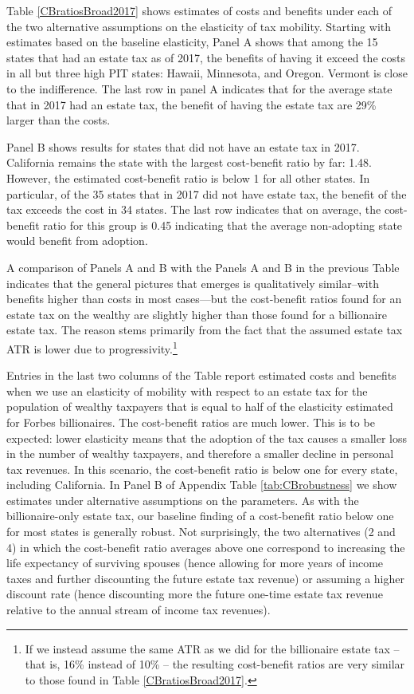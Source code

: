 \documentclass[12pt]{article}
\begin{document}
Table \ref{CBratiosBroad2017} shows estimates of costs and benefits  under each of the two alternative assumptions on  the elasticity of tax mobility.
Starting with estimates based on the baseline elasticity, Panel A shows  that among the 15 states that had an estate tax as of 2017, the benefits of having it exceed the costs in all but three high PIT states: Hawaii, Minnesota, and Oregon. Vermont is close to the indifference.
The last row in panel A indicates that for the average state that in 2017 had an estate tax, the benefit of having the estate tax are 29\% larger than the costs. 

Panel B shows results for states that did not have an estate tax in 2017.  California remains the state with the largest cost-benefit ratio by far: 1.48. However, the estimated cost-benefit ratio is below 1 for all other states. In particular, of the 35 states that in 2017 did not have estate tax, the benefit of the tax exceeds the cost in 34 states. The last row indicates that on average, the cost-benefit ratio for this group is 0.45 indicating that the average non-adopting state would benefit from adoption. 

A comparison of Panels A and B with the Panels A and B in the previous Table indicates that the general pictures that emerges is qualitatively similar--with benefits higher than costs in most cases---but the cost-benefit ratios found for an estate tax on the wealthy are slightly higher than those found for a billionaire estate tax. The reason stems primarily from the fact that the assumed estate tax ATR is  lower due to progressivity.\footnote{If we instead assume the same ATR as we did for the billionaire estate tax -- that is, 16\% instead of 10\% -- the resulting cost-benefit ratios are very similar to those found in Table \ref{CBratiosBroad2017}.}

Entries in the last two columns of the Table report estimated costs and benefits when we use an elasticity of mobility with respect to an estate tax for the population of wealthy taxpayers that is equal to half of the elasticity estimated for Forbes billionaires. The cost-benefit ratios are much lower. This is to be expected: lower elasticity means that the adoption of the tax causes a smaller loss in the number of wealthy taxpayers, and therefore a smaller decline in personal tax revenues. In this scenario, the cost-benefit ratio is below one for every state, including California.  In Panel B of Appendix Table \ref{tab:CBrobustness} we show estimates under 
alternative assumptions on the parameters. As with the billionaire-only estate tax, our baseline finding of a cost-benefit ratio below one for most states is generally robust. Not surprisingly, the two alternatives (2 and 4) in which the cost-benefit ratio averages above one correspond to increasing the life expectancy of surviving spouses (hence allowing for more years of income taxes and further discounting the future estate tax revenue) or assuming a higher discount rate (hence discounting more the future one-time estate tax revenue relative to the annual stream of income tax revenues).
 
\end{document}
